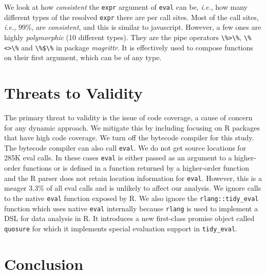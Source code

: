 \documentclass[USenglish,cleveref, autoref, thm-restate]{lipics-v2019}
\newcommand{\PercentMonomorphic}{99\%\xspace}
\newcommand{\UndefinedEvalsRnd}{285K\xspace}
\newcommand{\PercentUndefinedEval}{3.3\%\xspace}
\newcommand{\ie}{\emph{i.e.},\xspace}
\newcommand{\eval}{\texttt{eval}\xspace}
\renewcommand{\c}[1]{\lstinline{#1}\xspace}
\begin{document}
We look at how \emph{consistent} the \c{expr} argument of \eval can be, \ie
how many different types of the resolved \c{expr} there are per call
sites. Most of the call sites, \ie \PercentMonomorphic, are
\emph{consistent}, and this is similar to javascript. However, a few ones
are highly \emph{polymorphic} (10 different types). They are the pipe
operators \c{\%>\%}, \c{\%<>\%} and \c{\%$\%} in package \emph{magrittr}. It
is effectively used to compose functions on their first argument, which can
be of any type.

\section{Threats to Validity} The primary threat to validity is the issue of
code coverage, a cause of concern for any dynamic approach. We mitigate this
by including focusing on R packages that have high code coverage. We turn
off the bytecode compiler for this study. The bytecode compiler can also
call \eval. We do not get source locations for \UndefinedEvalsRnd eval
calls. In these cases \eval is either passed as an argument to a
higher-order functions or is defined in a function returned by a
higher-order function and the R parser does not retain location information
for \eval. However, this is a meager \PercentUndefinedEval of all eval calls
and is unlikely to affect our analysis. We ignore calls to the native \eval
function exposed by R. We also ignore the \c{rlang::tidy_eval} function
which uses native \eval internally because \c{rlang} is used to implement a
DSL for data analysis in R. It introduces a new first-class promise object
called \c{quosure} for which it implements special evaluation support in
\c{tidy_eval}.

\section{Conclusion}


\end{document}
